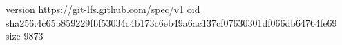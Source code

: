 version https://git-lfs.github.com/spec/v1
oid sha256:4c65b859229fbf53034c4b173c6eb49a6ac137cf07630301df066db64764fe69
size 9873
